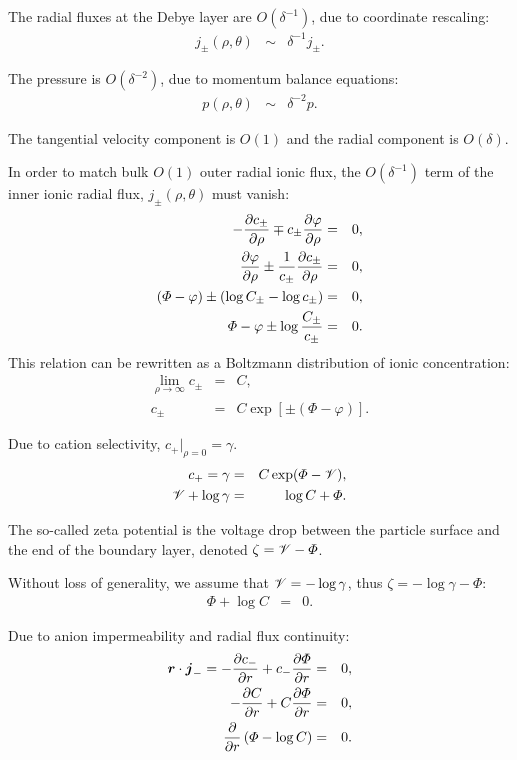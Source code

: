 The radial fluxes at the Debye layer are $O(\delta^{-1})$, due to coordinate rescaling:
\begin{eqnarray}
  j_\pm(\rho, \theta) &\sim& \delta^{-1} j_\pm.
\end{eqnarray}

The pressure is $O(\delta^{-2})$, due to momentum balance equations:
\begin{eqnarray}
  p(\rho, \theta) &\sim& \delta^{-2} p.
\end{eqnarray}

The tangential velocity component is $O(1)$ and the radial component is $O(\delta)$.

In order to match bulk $O(1)$ outer radial ionic flux, 
the $O(\delta^{-1})$ term of the inner ionic radial flux, $j_\pm(\rho, \theta)$ must vanish:
\begin{eqnarray}
  -\frac{\partial c_\pm}{\partial \rho} \mp c_\pm \frac{\partial \varphi}{\partial \rho} &=& 0, \\
  \frac{\partial \varphi}{\partial \rho} \pm\frac{1}{c_\pm}\frac{\partial c_\pm}{\partial \rho} &=& 0, \\
  \left(\varPhi - \varphi\right) \pm\left(\log C_\pm - \log c_\pm\right) &=& 0, \\
  \varPhi - \varphi \pm \log \frac{C_\pm}{c_\pm} &=& 0.
\end{eqnarray}
This relation can be rewritten as a Boltzmann distribution of ionic concentration:
\begin{eqnarray}
\lim_{\rho\rightarrow\infty} c_\pm &=& C, \\
c_\pm &=& C \exp\left[\pm(\varPhi - \varphi)\right].
\end{eqnarray}

Due to cation selectivity, $c_+|_{\rho=0} = \gamma$.
\begin{eqnarray}
  c_+ = \gamma &=& C \exp(\varPhi - \mathscr{V}), \\
  \mathscr{V} + \log \gamma &=& \log C + \varPhi.
\end{eqnarray}

The so-called zeta potential is 
the voltage drop between the particle surface and the end of
the boundary layer, denoted $\zeta = \mathscr{V} - \varPhi$. 

Without loss of generality, 
we assume that $\mathscr{V} = -\log\gamma$, thus $\zeta = -\log\gamma-\varPhi$:
\begin{eqnarray}
\varPhi + \log C &=& 0.
\end{eqnarray}

Due to anion impermeability and radial flux continuity:
\begin{eqnarray}
  \boldsymbol{r} \cdot \boldsymbol{j}_- = -\frac{\partial c_-}{\partial r} + c_- \frac{\partial \varPhi}{\partial r} &=& 0, \\
-\frac{\partial C}{\partial r} + C \frac{\partial \varPhi}{\partial r} &=& 0, \\
\frac{\partial }{\partial r}\left(\varPhi - \log C\right) &=& 0.
\end{eqnarray}

